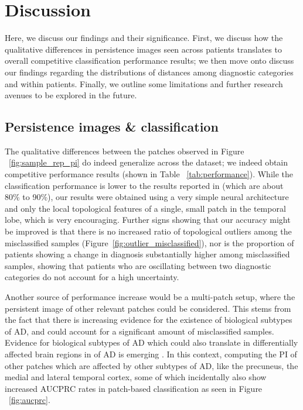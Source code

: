 \documentclass{article}
\begin{document}
\section{Discussion}\label{sec:discussion}

Here, we discuss our findings and their significance. First, we discuss how the qualitative differences in persistence images seen across patients translates to overall competitive classification performance results; we then move onto discuss our findings regarding the distributions of distances among diagnostic categories and within patients. Finally, we outline some limitations and further research avenues to be explored in the future.

\subsection{Persistence images \& classification}

The qualitative differences between the patches observed in Figure ~\ref{fig:sample_rep_pi} do indeed generalize across the dataset; we indeed obtain competitive performance results (shown in Table ~\ref{tab:performance}). While the classification performance is lower to the results reported in \citep{wen2020convolutional} (which are about 80\% to 90\%), our results were obtained using a very simple neural architecture and only the local topological features of a single, small patch in the temporal lobe, which is very encouraging. Further signs showing that our accuracy might be improved is that there is no increased ratio of topological outliers among the misclassified samples (Figure~\ref{fig:outlier_misclassified}), nor is the proportion of patients showing a change in diagnosis substantially higher among misclassified samples, showing that patients who are oscillating between two diagnostic categories do not account for a high uncertainty.

Another source of performance increase would be a multi-patch setup, where the persistent image of other relevant patches could be considered. This stems from the fact that there is increasing evidence for the existence of biological subtypes of AD, and could account for a significant amount of misclassified samples. Evidence for biological subtypes of AD which could also translate in differentially affected brain regions in of AD is emerging \citep{tijms2020pathophysiological,poulakis2018heterogeneous}. In this context, computing the PI of other patches which are affected by other subtypes of AD, like the precuneus, the medial and lateral temporal cortex, some of which incidentally also show increased AUCPRC rates in patch-based classification as seen in Figure ~\ref{fig:aucprc}.
\end{document}
